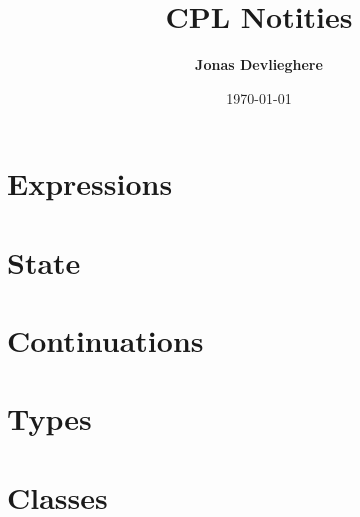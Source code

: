 \documentclass[a4paper, 10pt, oneside]{article}
\title{CPL Notities}
\date{\today}
\author{\textbf{Jonas Devlieghere}}
\begin{document}
\maketitle
\newpage

\tableofcontents
\newpage

\section{Expressions}


\newpage
\section{State}


\newpage
\section{Continuations}


\newpage
\section{Types}


\newpage
\section{Classes}


\appendix

\nocite{*}
\printbibliography
\end{document}

